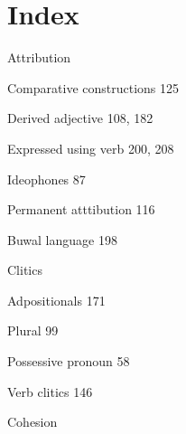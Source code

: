 \setcounter{page}{1}\chapter[Index]{Index}
\hypertarget{RefHeading1213701525720847}{}\begin{multicols}{2}
\begin{styleindexi}
Attribution
\end{styleindexi}

\begin{styleindexii}
Comparative constructions  125
\end{styleindexii}

\begin{styleindexii}
Derived adjective  108, 182
\end{styleindexii}

\begin{styleindexii}
Expressed using verb  200, 208
\end{styleindexii}

\begin{styleindexii}
Ideophones  87
\end{styleindexii}

\begin{styleindexii}
Permanent atttibution  116
\end{styleindexii}

\begin{styleindexi}
Buwal language  198
\end{styleindexi}

\begin{styleindexi}
Clitics
\end{styleindexi}

\begin{styleindexii}
Adpositionals  171
\end{styleindexii}

\begin{styleindexii}
Plural  99
\end{styleindexii}

\begin{styleindexii}
Possessive pronoun  58
\end{styleindexii}

\begin{styleindexii}
Verb clitics  146
\end{styleindexii}

\begin{styleindexi}
Cohesion
\end{styleindexi}


\end{multicols}
